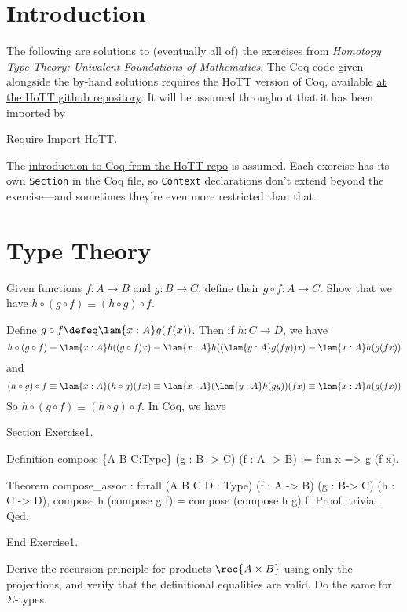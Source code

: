 \section*{Introduction}

The following are solutions to (eventually all of) the exercises from
\emph{Homotopy Type Theory: Univalent Foundations of Mathematics}.  The Coq
code given alongside the by-hand solutions requires the HoTT version of Coq,
available \href{https://github.com/HoTT}{at the HoTT github repository}.  It
will be assumed throughout that it has been imported by

\nwenddocs{}\endmoddef
Require Import HoTT.

\nwendcode{}The
\href{https://github.com/HoTT/book/blob/master/coq_introduction/Reading_HoTT_in_Coq.v}{introduction
to Coq from the HoTT repo} is assumed.  Each exercise has its own
\lstinline|Section| in the Coq file, so \lstinline|Context| declarations don't
extend beyond the exercise---and sometimes they're even more restricted than
that.

\section{Type Theory}

  Given functions $f:A\to B$ and $g:B\to C$, define
their  $g \circ f : A \to C$.  Show that we have $h \circ (g
\circ f) \equiv (h \circ g) \circ f$.

\soln
Define $g \circ f \defeq \lam{x:A}g(f(x))$.  Then if $h:C \to D$, we
have
\[
  h \circ (g \circ f) 
  \equiv \lam{x:A}h((g \circ f)x)
  \equiv \lam{x:A}h((\lam{y:A}g(fy))x)
  \equiv \lam{x:A}h(g(fx))
\]
and
\[
  (h \circ g) \circ f 
  \equiv \lam{x:A}(h \circ g)(fx)
  \equiv \lam{x:A}(\lam{y:A}h(gy))(fx)
  \equiv \lam{x:A}h(g(fx))
\]
So $h \circ (g \circ f) \equiv (h \circ g) \circ f$.  In Coq, we have

\nwenddocs{}\plusendmoddef
Section Exercise1.

Definition compose \{A B C:Type\} (g : B -> C) (f : A -> B) :=
    fun x => g (f x).

Theorem compose_assoc : forall (A B C D : Type) (f : A -> B) (g : B-> C) (h : C -> D),
    compose h (compose g f) = compose (compose h g) f.
Proof.
  trivial.
Qed.

End Exercise1.

\nwendcode{}%
  Derive the recursion principle for products $\rec{A
  \times B}$ using only the projections, and verify that the definitional
equalities are valid.  Do the same for $\Sigma$-types.

